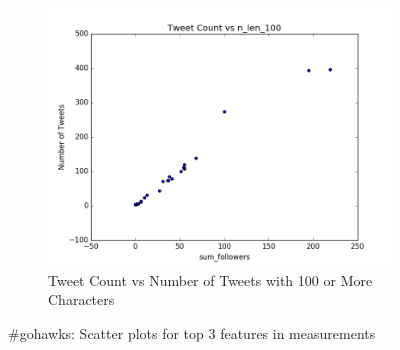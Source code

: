 \documentclass[12pt]{article}
\begin{document}
\begin{figure}[H]
\begin{subfigure}{.45\textwidth}
\includegraphics[width=\textwidth]{figures/count_vs_n_len_100_tweets_gohawks.png}
\caption{Tweet Count vs Number of Tweets with 100 or More Characters }
\label{part1:fig:LC}
\end{subfigure}

\caption{\#gohawks: Scatter plots for top 3 features in measurements}
\label{part1:fig}
\end{figure}
\end{document}
